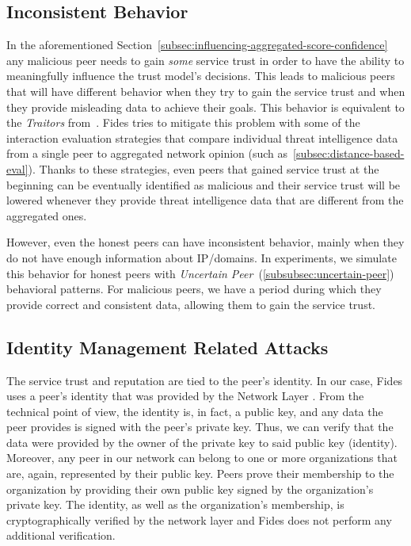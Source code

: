 \subsection{Inconsistent Behavior}
\label{subsec:inconsistent-behavior}
In the aforementioned Section~\ref{subsec:influencing-aggregated-score-confidence} any malicious peer needs to gain \textit{some} service trust in order to have the ability to meaningfully influence the trust model's decisions.
This leads to malicious peers that will have different behavior when they try to gain the service trust and when they provide misleading data to achieve their goals.
This behavior is equivalent to the \textit{Traitors} from~\cite{KOUTROULI201247}.
Fides tries to mitigate this problem with some of the interaction evaluation strategies that compare individual threat intelligence data from a single peer to aggregated network opinion (such as~\ref{subsec:distance-based-eval}).
Thanks to these strategies, even peers that gained service trust at the beginning can be eventually identified as malicious and their service trust will be lowered whenever they provide threat intelligence data that are different from the aggregated ones.

However, even the honest peers can have inconsistent behavior, mainly when they do not have enough information about IP/domains.
In experiments, we simulate this behavior for honest peers with \textit{Uncertain Peer}~(\ref{subsubsec:uncertain-peer}) behavioral patterns.
For malicious peers, we have a period during which they provide correct and consistent data, allowing them to gain the service trust. 

\subsection{Identity Management Related Attacks}
\label{subsec:identity-management-attacks}
The service trust and reputation are tied to the peer's identity. 
In our case, Fides uses a peer's identity that was provided by the Network Layer \cite{nl}.
From the technical point of view, the identity is, in fact, a public key, and any data the peer provides is signed with the peer's private key. Thus, we can verify that the data were provided by the owner of the private key to said public key (identity).
Moreover, any peer in our network can belong to one or more organizations that are, again, represented by their public key. 
Peers prove their membership to the organization by providing their own public key signed by the organization's private key.
The identity, as well as the organization's membership, is cryptographically verified by the network layer \cite{nl} and Fides does not perform any additional verification. 

